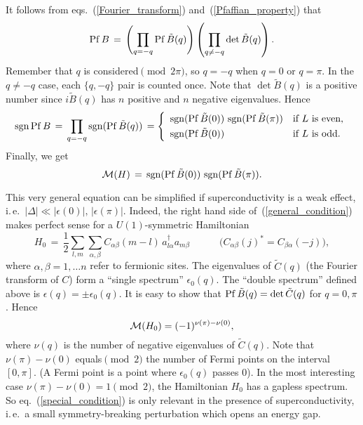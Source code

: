 It follows from eqs.~(\ref{Fourier_transform}) and~(\ref{Pfaffian_property})
that
\begin{equation}
\mathop{\rm Pf}\nolimits B \,=\,
\left( \prod_{q=-q} \mathop{\rm Pf}\nolimits {\tilde B}(q) \right)
\left( \prod_{q\not=-q} \det {\tilde B(q)} \right).
\end{equation}
Remember that $q$ is considered$\pmod{2\pi}$, so $q=-q$ when $q=0$ or
$q=\pi$. In the $q\not=-q$ case, each $\{q,-q\}$ pair is counted once.  Note
that $\det{\tilde B(q)}$ is a positive number since $i{\tilde B}(q)$ has $n$
positive and $n$ negative eigenvalues.  Hence
\begin{equation}
\sgn\Pf B \,=\, \prod_{q=-q} \sgn(\Pf {\tilde B}(q)) \,=
\left\{\begin{array}{ll}
\sgn(\Pf {\tilde B}(0))\, \sgn(\Pf {\tilde B}(\pi)) & \mbox{if $L$ is even,}
\smallskip\\
\sgn(\Pf {\tilde B}(0)) & \mbox{if $L$ is odd.}\\
\end{array}\right.
\end{equation}
Finally, we get
\begin{equation}\label{general_condition}
{\cal M}(H) \,=\, \mathop{\rm sgn}\nolimits(\mathop{\rm Pf}\nolimits {\tilde B}(0))\, \mathop{\rm sgn}\nolimits(\mathop{\rm Pf}\nolimits {\tilde B}(\pi)).
\end{equation}

This very general equation can be simplified if superconductivity is a weak
effect, i.\,e.\ $|\Delta|\ll|\epsilon(0)|,\,|\epsilon(\pi)|$. Indeed, the
right hand side of~(\ref{general_condition}) makes perfect sense for a
$U(1)$-symmetric Hamiltonian
\begin{equation}
H_0 \,=\, \frac{1}{2}
\sum_{l,m}\sum_{\alpha,\beta} C_{\alpha\beta}(m-l)\,
a_{l\alpha}^{\dagger}a_{m\beta}
\qquad\quad
\Bigr(  C_{\alpha\beta}(j)^*=C_{\beta\alpha}(-j) \Bigr),
\end{equation}
where $\alpha,\beta=1,\ldots n$ refer to fermionic sites. The eigenvalues of
${\tilde C}(q)$ (the Fourier transform of $C$) form a ``single spectrum''
$\epsilon_0(q)$. The ``double spectrum'' defined above is
$\epsilon(q)=\pm\epsilon_0(q)$. It is easy to show that $\mathop{\rm Pf}\nolimits {\tilde
B}(q)=\det {\tilde C}(q)$ for $q=0,\pi$. Hence
\begin{equation}\label{special_condition}
{\cal M}(H_0)=(-1)^{\nu(\pi)-\nu(0)},
\end{equation}
where $\nu(q)$ is the number of negative eigenvalues of ${\tilde C}(q)$. Note
that $\nu(\pi)-\nu(0)$ equals$\pmod{2}$ the number of Fermi points on the
interval $[0,\pi]$. (A Fermi point is a point where $\epsilon_0(q)$ passes
$0$). In the most interesting case $\nu(\pi)-\nu(0)=1\pmod{2}$, the
Hamiltonian $H_0$ has a gapless spectrum. So eq.~(\ref{special_condition}) is
only relevant in the presence of superconductivity, i.\,e.\ a small
symmetry-breaking perturbation which opens an energy gap.


